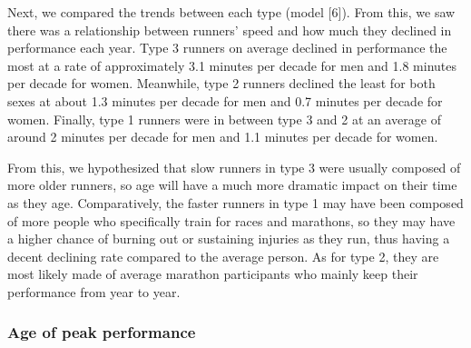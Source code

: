 \documentclass[12pt]{article}
\begin{document}
Next, we compared the trends between each type
(model [6]).
From this, we saw there was a relationship between runners' speed and how
much they declined in performance each year.
Type 3 runners on average declined in performance the most at a rate
of approximately 3.1 minutes per decade for men and 1.8 minutes per
decade for women.
Meanwhile, type 2 runners declined the least for both sexes at about
1.3 minutes per decade for men and 0.7 minutes per decade for women.
Finally, type 1 runners were in between type 3 and 2 at an average of
around 2 minutes per decade for men and 1.1 minutes per decade for women.

From this, we hypothesized that slow runners in type 3 were usually
composed of more older runners, so age will have a much more dramatic
impact on their time as they age.
Comparatively, the faster runners in type 1 may have been composed of
more people who specifically train for races and marathons,
so they may have a higher chance of burning out or sustaining injuries
as they run, thus having a decent declining rate compared to the
average person.
As for type 2, they are most likely made of average marathon
participants who mainly keep their performance from year to year.

\subsubsection*{Age of peak performance}
\end{document}
